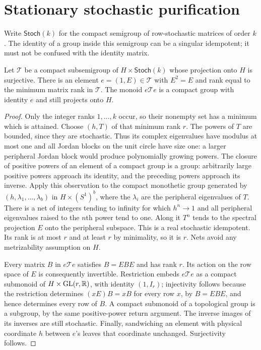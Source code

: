 \section{Stationary stochastic purification}\label{sec:purification55}
Write $\mathsf{Stoch}(k)$ for the compact semigroup of row-stochastic matrices of order $k$. The identity of a group inside this semigroup can be a singular idempotent; it must not be confused with the identity matrix.

\begin{lemma}\label{lem:idempotent55}
Let $\mathcal T$ be a compact subsemigroup of $H\times\mathsf{Stoch}(k)$ whose projection onto $H$ is surjective. There is an element $e=(1,E)\in\mathcal T$ with $E^2=E$ and rank equal to the minimum matrix rank in $\mathcal T$. The monoid $e\mathcal T e$ is a compact group with identity $e$ and still projects onto $H$.
\end{lemma}
\begin{proof}
Only the integer ranks $1,\ldots,k$ occur, so their nonempty set has a minimum which is attained. Choose $(h,T)$ of that minimum rank $r$. The powers of $T$ are bounded, since they are stochastic. Thus its complex eigenvalues have modulus at most one and all Jordan blocks on the unit circle have size one: a larger peripheral Jordan block would produce polynomially growing powers. The closure of positive powers of an element of a compact group is a group: arbitrarily large positive powers approach its identity, and the preceding powers approach its inverse. Apply this observation to the compact monothetic group generated by $(h,\lambda_1,\ldots,\lambda_b)$ in $H\times(S^1)^b$, where the $\lambda_i$ are the peripheral eigenvalues of $T$. There is a net of integers tending to infinity for which $h^n\to1$ and all peripheral eigenvalues raised to the $n$th power tend to one. Along it $T^n$ tends to the spectral projection $E$ onto the peripheral subspace. This is a real stochastic idempotent. Its rank is at most $r$ and at least $r$ by minimality, so it is $r$. Nets avoid any metrizability assumption on $H$.

Every matrix $B$ in $e\mathcal T e$ satisfies $B=EBE$ and has rank $r$. Its action on the row space of $E$ is consequently invertible. Restriction embeds $e\mathcal T e$ as a compact submonoid of $H\times\mathrm{GL}(r,\mathbb R)$, with identity $(1,I_r)$; injectivity follows because the restriction determines $(xE)B=xB$ for every row $x$, by $B=EBE$, and hence determines every row of $B$. A compact submonoid of a topological group is a subgroup, by the same positive-power return argument. The inverse images of its inverses are still stochastic. Finally, sandwiching an element with physical coordinate $h$ between $e$'s leaves that coordinate unchanged. Surjectivity follows.
\end{proof}

